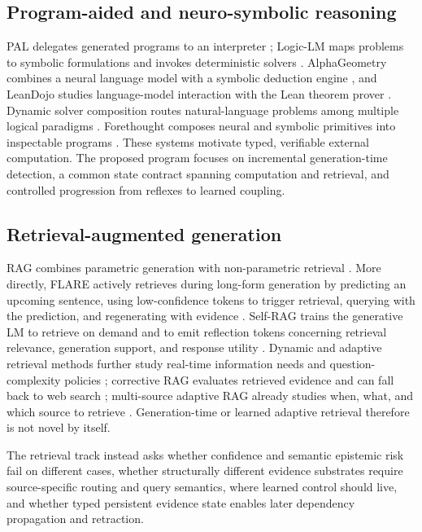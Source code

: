 \documentclass[11pt]{article}
\begin{document}
\subsection{Program-aided and neuro-symbolic reasoning}

PAL delegates generated programs to an interpreter \cite{pal}; Logic-LM maps
problems to symbolic formulations and invokes deterministic solvers
\cite{logiclm}.  AlphaGeometry combines a neural language model with a symbolic
deduction engine \cite{alphageometry}, and LeanDojo studies language-model
interaction with the Lean theorem prover \cite{leandojo}.  Dynamic solver
composition routes natural-language problems among multiple logical paradigms
\cite{dynamic}.  Forethought composes neural and symbolic primitives into
inspectable programs \cite{forethought}.  These systems motivate typed,
verifiable external computation.  The proposed program focuses on incremental
generation-time detection, a common state contract spanning computation and
retrieval, and controlled progression from reflexes to learned coupling.

\subsection{Retrieval-augmented generation}

RAG combines parametric generation with non-parametric retrieval
\cite{rag}.  More directly, FLARE actively retrieves during long-form generation
by predicting an upcoming sentence, using low-confidence tokens to trigger
retrieval, querying with the prediction, and regenerating with evidence
\cite{flare}.  Self-RAG trains the generative LM to retrieve on demand and to
emit reflection tokens concerning retrieval relevance, generation support, and
response utility \cite{selfrag}.  Dynamic and adaptive retrieval methods further
study real-time information needs and question-complexity policies
\cite{dragin,adaptiverag}; corrective RAG evaluates retrieved evidence and can
fall back to web search \cite{crag}; multi-source adaptive RAG already studies
when, what, and which source to retrieve \cite{mspr}.  Generation-time or
learned adaptive retrieval therefore is not novel by itself.

The retrieval track instead asks whether confidence and semantic epistemic risk
fail on different cases, whether structurally different evidence substrates
require source-specific routing and query semantics, where learned control
should live, and whether typed persistent evidence state enables later
dependency propagation and retraction.
\end{document}
